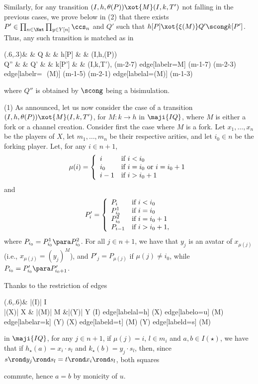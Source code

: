\documentclass{LMCS}
\renewcommand{\QFI}{\maji{IQ}}
\renewcommand{\LLL}{\QFI}
\theoremstyle{plain}\newtheorem{satz}[thm]{Satz}
\begin{document}
Similarly, for any transition $(I,h,\theta(P)) \xot{M}
(I,k,T')$ not falling in the previous cases,  
we prove below in (2) that there exists $P' \in
\prod_{n \in \Nat} \prod_{y \in Y[n]} \ccs_n$ and $Q'$ such that 
$h[P] \xot{\xi(M)} Q' \scong k[P']$. Thus, any such transition is matched
as in 

\begin{center}
  \diag(.6,.3){\& \& Q \& \scong \& h[P] \& \III \& (I,h,\theta(P)) \\
    Q'' \& \scong \& Q' \& \scong \& k[P'] \& \III \& (I,k,T'), }{(m-2-7) edge[labelr={M}] (m-1-7) (m-2-3) edge[labelr={\ \,\xi(M)}] (m-1-5) (m-2-1) edge[labelal={\xi(M)}] (m-1-3) }
\end{center}
where $Q''$ is obtained by $\scong$ being a bisimulation.

(1) As announced, let us now consider the case of a transition
$(I,h,\theta(P)) \xot{M} (I,k,T')$, for $M \colon k \to h$ in $\LLL$,
where $M$ is either a fork or a channel creation. Consider first the
case where $M$ is a fork. Let $x_1, \ldots, x_n$ be the players of
$X$, let $m_1, \ldots, m_n$ be their respective arities, and let $i_0
\in n$ be the forking player.  Let, for any $i \in n+1$,
$$\mu(i) = \left \{
\begin{array}[c]{ll}
  i & \mbox{if $i < i_0$} \\
  i_0 & \mbox{if $i = i_0$ or $i = i_0 + 1$} \\
  {i-1} & \mbox{if $i > i_0 + 1$}
\end{array} \right .$$
and $$P'_i = \left \{
\begin{array}[c]{ll}
  P_i & \mbox{if $i < i_0$} \\
  P_{i_0}^1 & \mbox{if $i = i_0$} \\
  P_{i_0}^2 & \mbox{if $i = i_0 + 1$} \\
  P_{i-1} & \mbox{if $i > i_0 + 1$},
\end{array} \right .$$
where $P_{i_0} = P^1_{i_0} \para P^2_{i_0}$.
For all $j \in n+1$, we have that $y_j$ is an avatar of
$x_{\mu(j)}$ (i.e., $x_{\mu(j)} = (y_j)^M$), 
and $P'_j = P_{\mu(j)}$ if $\mu(j) \neq i_0$, while $P_{i_0} = P'_{i_0} \para P'_{i_0 + 1}$.

Thanks to the restriction of edges
  \begin{center}
    \diag(.6,.6){\& |(I)| I \\
      |(X)| X \& |(M)| M \&|(Y)| Y }{(I) edge[labelal={h}] (X) edge[labelo={u}] (M) edge[labelar={k}] (Y) (X) edge[labeld={t}] (M) (Y) edge[labeld={s}] (M) }
\end{center}
 in $\LLL$,
for any $j \in n+1$, if $\mu(j) = i$, $l \in m_i$ and $a,b
\in I(\star)$, we have that if $h_\star(a) = x_i \cdot s_l$
and $k_\star(b) = y_j \cdot s_l$, then,
since $s \rond y_j \rond s_l = t \rond x_i \rond s_l$, both squares
\begin{center}
\end{center}
commute, hence $a = b$ by monicity of $u$. 
\end{document}
